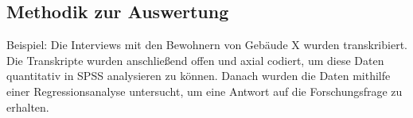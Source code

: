 \subsection{Methodik zur Auswertung}

Beispiel:
Die Interviews mit den Bewohnern von Gebäude X wurden transkribiert. Die Transkripte wurden anschließend offen und axial codiert, um diese Daten quantitativ in SPSS analysieren zu können. Danach wurden die Daten mithilfe einer Regressionsanalyse untersucht, um eine Antwort auf die Forschungsfrage zu erhalten.